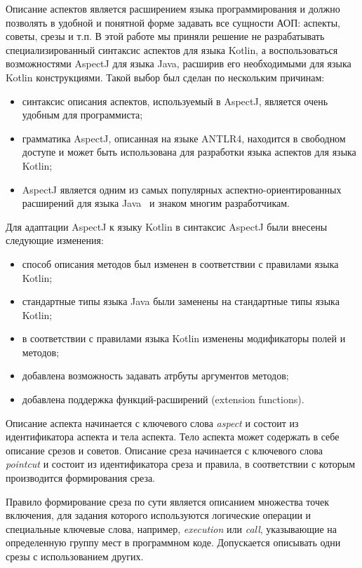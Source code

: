 \documentclass[conference]{IEEEtran}
\begin{document}
Описание аспектов является расширением языка программирования и должно позволять
в удобной и понятной форме задавать все сущности АОП: аспекты, советы, срезы и
т.п.
В этой работе мы приняли решение не разрабатывать специализированный синтаксис 
аспектов для языка Kotlin, а воспользоваться возможностями  AspectJ для 
языка Java, расширив его необходимыми для языка Kotlin конструкциями. 
Такой выбор был сделан по нескольким причинам:
\begin{itemize}
	\item синтаксис описания аспектов, используемый в AspectJ, является очень
		  удобным для программиста;
	\item грамматика AspectJ, описанная на языке ANTLR4, находится
		  в свободном доступе и может быть использована для разработки
		  языка аспектов для языка Kotlin;
	\item AspectJ является одним из самых популярных аспектно-ориентированных
		  расширений для языка Java~\cite{aspect_review} и знаком многим
		  разработчикам.
\end{itemize}

Для адаптации AspectJ к языку Kotlin в синтаксис AspectJ были внесены следующие
изменения:
\begin{itemize}
	\item способ описания методов был изменен в соответствии с правилами языка
	      Kotlin;
	\item стандартные типы языка Java были заменены на стандартные типы языка
		  Kotlin;
	\item в соответствии с правилами языка Kotlin изменены модификаторы полей и
	      методов;
	\item добавлена возможность задавать атрбуты аргументов методов;
	\item добавлена поддержка функций-расширений (extension functions).
\end{itemize}

Описание аспекта начинается с ключевого слова \textit{aspect} и состоит из 
идентификатора аспекта и тела аспекта.
Тело аспекта может содержать в себе описание срезов и советов.
Описание среза начинается с ключевого слова \textit{pointcut} и состоит из
идентификатора среза и правила, в соответствии с которым производится
формирования среза.

Правило формирование среза по сути является описанием множества точек включения, 
для задания которого используются логические операции и специальные ключевые 
слова, например, \textit{execution} или \textit{call}, указывающие на
определенную группу мест в программном коде.
Допускается описывать одни срезы с использованием других. 
\end{document}
